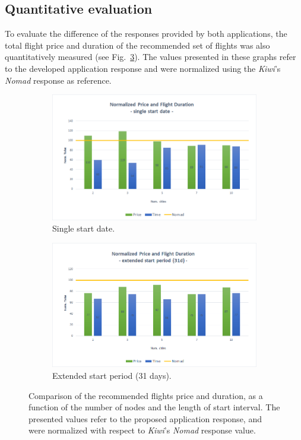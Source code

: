\subsection{Quantitative evaluation}
\label{sec:quantitative_eval}

To evaluate the difference of the responses provided by both applications, the total flight price and duration of the recommended set of flights was also quantitatively measured (see Fig.~\ref{fig:comparison}). The values presented in these graphs refer to the developed application response and were normalized using the \textit{Kiwi}'s \textit{Nomad} response as reference. 


\begin{figure}[h!]
\centering
    \begin{subfigure}[a]{0.5\textwidth}
      \includegraphics[width=1\linewidth]{./imgs/normalized_results_ss.png}
      \caption{Single start date.}
      \label{fig:comparison_a} 
    \end{subfigure}
    \begin{subfigure}[b]{0.5\textwidth}
      \includegraphics[width=1\linewidth]{./imgs/normalized_results_es.png}
      \caption{Extended start period (31 days).}
      \label{fig:comparison_b}
    \end{subfigure}
 \caption{Comparison of the recommended flights price and duration, as a function of the number of nodes and the length of start interval. The presented values refer to the proposed application response, and were normalized with respect to \textit{Kiwi}'s \textit{Nomad} response value.}
 \label{fig:comparison}
\end{figure}

